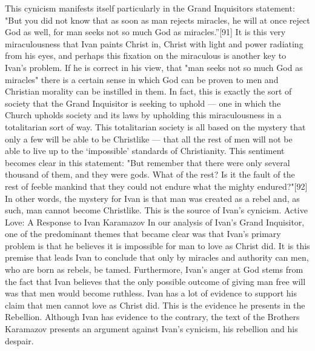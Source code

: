 This cynicism manifests itself particularly in the Grand Inquisitors statement: "But you did not know that as soon as man rejects miracles, he will at once reject God as well, for man seeks not so much God as miracles.”[91] It is this very miraculousness that Ivan paints Christ in, Christ with light and power radiating from his eyes, and perhaps this fixation on the miraculous is another key to Ivan's problem. If he is correct in his view, that "man seeks not so much God as miracles" there is a certain sense in which God can be proven to men and Christian morality can be instilled in them. In fact, this is exactly the sort of society that the Grand Inquisitor is seeking to uphold — one in which the Church upholds society and its laws by upholding this miraculousness in a totalitarian sort of way.
This totalitarian society is all based on the mystery that only a few will be able to be Christlike — that all the rest of men will not be able to live up to the ‘impossible’ standards of Christianity. This sentiment becomes clear in this statement: "But remember that there were only several thousand of them, and they were gods. What of the rest? Is it the fault of the rest of feeble mankind that they could not endure what the mighty endured?"[92] In other words, the mystery for Ivan is that man was created as a rebel and, as such, man cannot become Christlike. This is the source of Ivan's cynicism.
Active Love: A Response to Ivan Karamazov
In our analysis of Ivan's Grand Inquisitor, one of the predominant themes that became clear was that Ivan's primary problem is that he believes it is impossible for man to love as Christ did. It is this premise that leads Ivan to conclude that only by miracles and authority can men, who are born as rebels, be tamed. Furthermore, Ivan's anger at God stems from the fact that Ivan believes that the only possible outcome of giving man free will was that men would become ruthless. Ivan has a lot of evidence to support his claim that men cannot love as Christ did. This is the evidence he presents in the Rebellion. Although Ivan has evidence to the contrary, the text of the Brothers Karamazov presents an argument against Ivan's cynicism, his rebellion and his despair.
